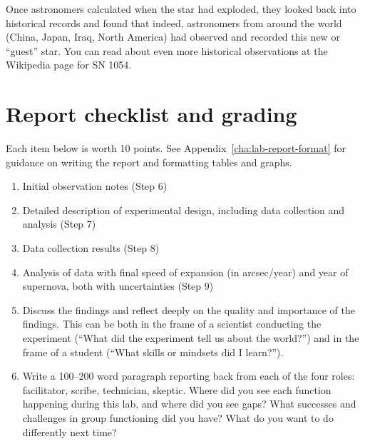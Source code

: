 Once astronomers calculated when the star had exploded, they looked back into historical records and found that indeed, astronomers from around the world (China, Japan, Iraq, North America) had observed and recorded this new or ``guest'' star. You can read about even more historical observations at the Wikipedia page for SN 1054.

\section{Report checklist and grading}

Each item below is worth 10 points. See Appendix\ \ref{cha:lab-report-format} for guidance on writing the report and formatting tables and graphs.

\begin{enumerate}
	
	\item Initial observation notes (Step 6)
	
	\item Detailed description of experimental design, including data collection and analysis (Step 7)
	
	\item Data collection results (Step 8)
	
	\item Analysis of data with final speed of expansion (in arcsec/year) and year of supernova, both with uncertainties (Step 9)
	
	\item Discuss the findings and reflect deeply on the quality and importance of the findings. This can
	be both in the frame of a scientist conducting the experiment (“What did the experiment tell us
	about the world?”) and in the frame of a student (“What skills or mindsets did I learn?”).
	
	\item Write a 100--200 word paragraph reporting back from each of the four roles: facilitator, scribe, technician, skeptic. Where did you see each function happening during this lab, and where did you see gaps? What successes and challenges in group functioning did you have? What do you want to do differently next time?
\end{enumerate}